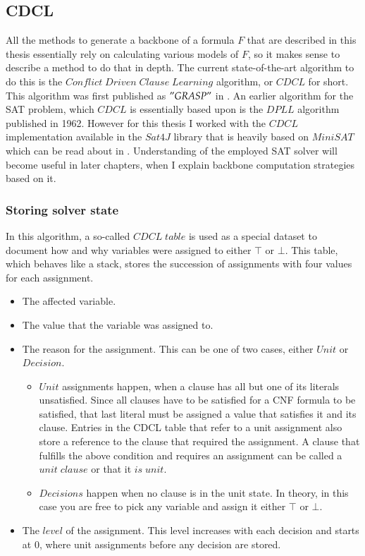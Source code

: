 \subsection{CDCL}
\label{ss:cdcl}
All the methods to generate a backbone of a formula $F$ that are described in this thesis essentially rely on calculating various models of $F$, so it makes sense to describe a method to do that in depth. The current state-of-the-art algorithm to do this is the $Conflict\;Driven\;Clause\;Learning$ algorithm, or $CDCL$ for short. This algorithm was first published as $"GRASP"$ in \cite{GRASP}. An earlier algorithm for the SAT problem, which $CDCL$ is essentially based upon is the $DPLL$ algorithm \cite{dpll} published in 1962. However for this thesis I worked with the $CDCL$ implementation available in the $Sat4J$ library that is heavily based on $MiniSAT$ which can be read about in \cite{minisat}. Understanding of the employed SAT solver will become useful in later chapters, when I explain backbone computation strategies based on it.

\subsubsection{Storing solver state}

In this algorithm, a so-called $CDCL\;table$ is used as a special dataset to document how and why variables were assigned to either $\top$ or $\bot$. This table, which behaves like a stack, stores the succession of assignments with four values for each assignment.
\begin{itemize}
\item The affected variable.
\item The value that the variable was assigned to.
\item The reason for the assignment. This can be one of two cases, either $Unit$ or $Decision$.
\begin{itemize}
\item $Unit$ assignments happen, when a clause has all but one of its literals unsatisfied. Since all clauses have to be satisfied for a CNF formula to be satisfied, that last literal must be assigned a value that satisfies it and its clause. Entries in the CDCL table that refer to a unit assignment also store a reference to the clause that required the assignment. A clause that fulfills the above condition and requires an assignment can be called a $unit\; clause$ or that it $is\; unit$.
\item $Decisions$ happen when no clause is in the unit state. In theory, in this case you are free to pick any variable and assign it either $\top$ or $\bot$. 
\end{itemize}
\item The $level$ of the assignment. This level increases with each decision and starts at 0, where unit assignments before any decision are stored.
\end{itemize}

